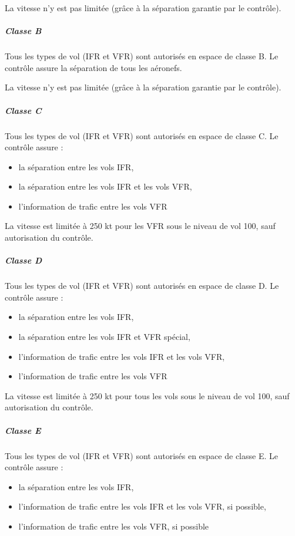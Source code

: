 		
		La vitesse n'y est pas limitée (grâce à la séparation garantie par le contrôle).
		
		\subparagraph{Classe B}
		Tous les types de vol (IFR et VFR) sont autorisés en espace de classe B. Le contrôle assure la séparation de tous les aéronefs.
		
		
		La vitesse n'y est pas limitée (grâce à la séparation garantie par le contrôle).
		
		\subparagraph{Classe C}
		Tous les types de vol (IFR et VFR) sont autorisés en espace de classe C. Le contrôle assure :
		\begin{itemize}
		\item la séparation entre les vols IFR,
		\item la séparation entre les vols IFR et les vols VFR,
		\item l'information de trafic entre les vols VFR
		\end{itemize}
		
		
		La vitesse est limitée à 250 kt pour les VFR sous le niveau de vol 100, sauf autorisation du contrôle.
		
		\subparagraph{Classe D}\label{classeD}
		Tous les types de vol (IFR et VFR) sont autorisés en espace de classe D. Le contrôle assure :
		\begin{itemize}
		\item la séparation entre les vols IFR,
		\item la séparation entre les vols IFR et VFR spécial,
		\item l'information de trafic entre les vols IFR et les vols VFR,
		\item l'information de trafic entre les vols VFR
		\end{itemize}
		
		
		La vitesse est limitée à 250 kt pour tous les vols sous le niveau de vol 100, sauf autorisation du contrôle.
		
		\subparagraph{Classe E}
		Tous les types de vol (IFR et VFR) sont autorisés en espace de classe E. Le contrôle assure :
		\begin{itemize}
		\item la séparation entre les vols IFR,
		\item l'information de trafic entre les vols IFR et les vols VFR, si possible,
		\item l'information de trafic entre les vols VFR, si possible
		\end{itemize}
		
